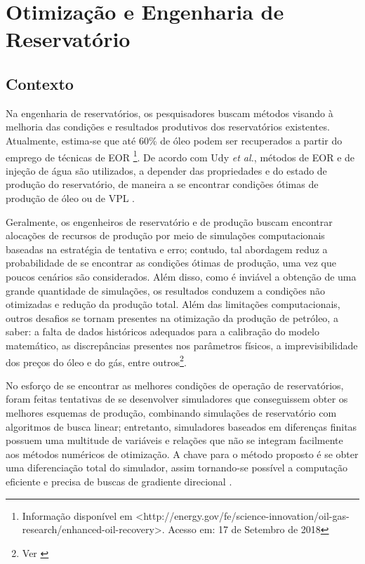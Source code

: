 \section{Otimiza\c{c}\~{a}o e Engenharia de Reservat\'{o}rio}
\subsection{Contexto}
Na engenharia de reservat\'{o}rios, os pesquisadores buscam m\'{e}todos visando \`{a} melhoria das condi\c{c}\~{o}es e resultados produtivos dos reservat\'{o}rios existentes. Atualmente, estima-se que at\'{e} 60\% de \'{o}leo podem ser recuperados a partir do emprego de t\'{e}cnicas de EOR \footnote{Informa\c{c}\~{a}o dispon\'{i}vel em <http://energy.gov/fe/science-innovation/oil-gas-research/enhanced-oil-recovery>. Acesso em: 17 de Setembro de 2018}. De acordo com Udy \textit{et al.}, m\'{e}todos de EOR e de inje\c{c}\~{a}o de \'{a}gua s\~{a}o utilizados, a depender das propriedades e do estado de produ\c{c}\~{a}o do reservat\'{o}rio, de maneira a se encontrar condi\c{c}\~{o}es \'{o}timas de produ\c{c}\~{a}o de \'{o}leo ou de VPL \cite{udyEOR}.

Geralmente, os engenheiros de reservat\'{o}rio e de produ\c{c}\~{a}o buscam encontrar aloca\c{c}\~{o}es de recursos de produ\c{c}\~{a}o por meio de simula\c{c}\~{o}es computacionais baseadas na estrat\'{e}gia de tentativa e erro; contudo, tal abordagem reduz a probabilidade de se encontrar as condi\c{c}\~{o}es \'{o}timas de produ\c{c}\~{a}o, uma vez que poucos cen\'{a}rios s\~{a}o considerados. Al\'{e}m disso, como \'{e} invi\'{a}vel a obten\c{c}\~{a}o de uma grande quantidade de simula\c{c}\~{o}es, os resultados conduzem a condi\c{c}\~{o}es n\~{a}o otimizadas e redu\c{c}\~{a}o da produ\c{c}\~{a}o total. Al\'{e}m das limita\c{c}\~{o}es computacionais, outros desafios se tornam presentes na otimiza\c{c}\~{a}o da produ\c{c}\~{a}o de petr\'{o}leo, a saber: a falta de dados hist\'{o}ricos adequados para a calibra\c{c}\~{a}o do modelo matem\'{a}tico, as discrep\^{a}ncias presentes nos par\^{a}metros f\'{i}sicos, a imprevisibilidade dos pre\c{c}os do \'{o}leo e do g\'{a}s, entre outros\footnote{Ver \cite{udyEOR}}.

No esfor\c{c}o de se encontrar as melhores condi\c{c}\~{o}es de opera\c{c}\~{a}o de reservat\'{o}rios, foram feitas tentativas de se desenvolver simuladores que conseguissem obter os melhores esquemas de produ\c{c}\~{a}o, combinando simula\c{c}\~{o}es de reservat\'{o}rio com algoritmos de busca linear; entretanto, simuladores baseados em diferen\c{c}as finitas possuem uma multitude de vari\'{a}veis e rela\c{c}\~{o}es que n\~{a}o se integram facilmente aos m\'{e}todos num\'{e}ricos de otimiza\c{c}\~{a}o. A chave para o m\'{e}todo proposto \'{e} se obter uma diferencia\c{c}\~{a}o total do simulador, assim tornando-se poss\'{i}vel a computa\c{c}\~{a}o eficiente e precisa de buscas de gradiente direcional \cite{asheim88}. 

